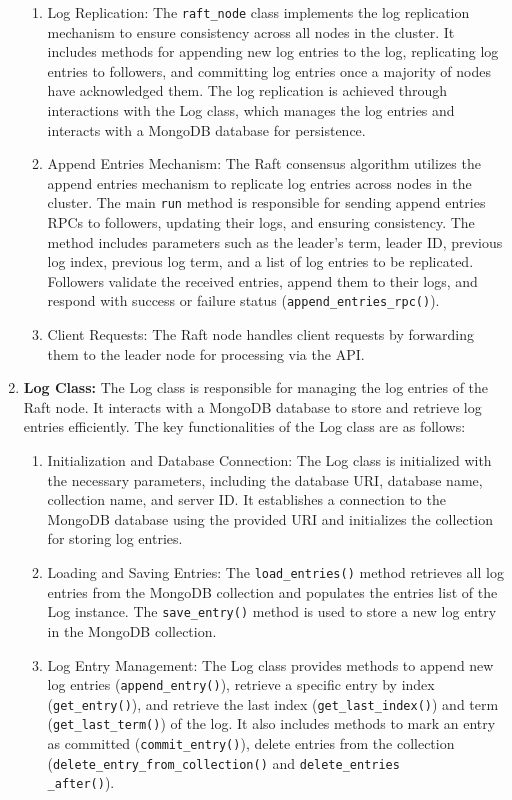 \documentclass{article}
\begin{document}
\begin{enumerate}
\begin{enumerate}
		\item Log Replication: The \texttt{raft\_node} class implements the log replication mechanism to ensure consistency across all nodes in the cluster. It includes methods for appending new log entries to the log, replicating log entries to followers, and committing log entries once a majority of nodes have acknowledged them. The log replication is achieved through interactions with the Log class, which manages the log entries and interacts with a MongoDB database for persistence.
		\item Append Entries Mechanism: The Raft consensus algorithm utilizes the append entries mechanism to replicate log entries across nodes in the cluster. The main \texttt{run} method is responsible for sending append entries RPCs to followers, updating their logs, and ensuring consistency. The method includes parameters such as the leader's term, leader ID, previous log index, previous log term, and a list of log entries to be replicated. Followers validate the received entries, append them to their logs, and respond with success or failure status (\texttt{append\_entries\_rpc()}).
		\item Client Requests: The Raft node handles client requests by forwarding them to the leader node for processing via the API.
	\end{enumerate}
	\item \textbf{Log Class:}
	The Log class is responsible for managing the log entries of the Raft node. It interacts with a MongoDB database to store and retrieve log entries efficiently. The key functionalities of the Log class are as follows:
	\begin{enumerate}
		\item Initialization and Database Connection: The Log class is initialized with the necessary parameters, including the database URI, database name, collection name, and server ID. It establishes a connection to the MongoDB database using the provided URI and initializes the collection for storing log entries.
		\item Loading and Saving Entries: The \texttt{load\_entries()} method retrieves all log entries from the MongoDB collection and populates the entries list of the Log instance. The \texttt{save\_entry()} method is used to store a new log entry in the MongoDB collection.
		\item Log Entry Management: The Log class provides methods to append new log entries (\texttt{append\_entry()}), retrieve a specific entry by index (\texttt{get\_entry()}), and retrieve the last index (\texttt{get\_last\_index()}) and term (\texttt{get\_last\_term()}) of the log. It also includes methods to mark an entry as committed (\texttt{commit\_entry()}), delete entries from the collection (\texttt{delete\_entry\_from\_collection()} and \texttt{delete\_entries\\\_after()}).

\end{enumerate}
\end{enumerate}
\end{document}
